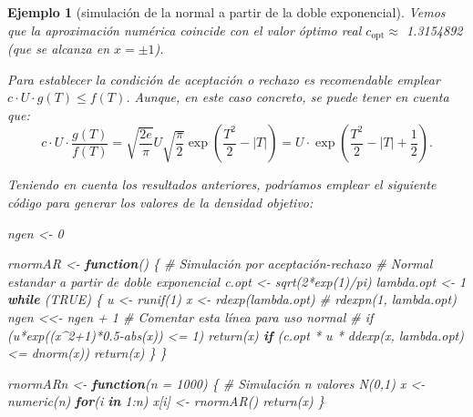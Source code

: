 \documentclass[
]{book}
\newenvironment{Shaded}{\begin{snugshade}}{\end{snugshade}}
\newcommand{\AttributeTok}[1]{\textcolor[rgb]{0.77,0.63,0.00}{#1}}
\newcommand{\CommentTok}[1]{\textcolor[rgb]{0.56,0.35,0.01}{\textit{#1}}}
\newcommand{\ConstantTok}[1]{\textcolor[rgb]{0.00,0.00,0.00}{#1}}
\newcommand{\ControlFlowTok}[1]{\textcolor[rgb]{0.13,0.29,0.53}{\textbf{#1}}}
\newcommand{\DecValTok}[1]{\textcolor[rgb]{0.00,0.00,0.81}{#1}}
\newcommand{\FunctionTok}[1]{\textcolor[rgb]{0.00,0.00,0.00}{#1}}
\newcommand{\NormalTok}[1]{#1}
\newcommand{\OtherTok}[1]{\textcolor[rgb]{0.56,0.35,0.01}{#1}}
\newcommand{\SpecialCharTok}[1]{\textcolor[rgb]{0.00,0.00,0.00}{#1}}
\theoremstyle{break}
\newtheorem{example}{Ejemplo}[chapter]
\theoremstyle{nonumberplain}
\begin{document}
\begin{example}[simulación de la normal a partir de la doble exponencial]
Vemos que la aproximación numérica coincide con el valor óptimo real \(c_{\text{opt}} \approx\) 1.3154892 (que se alcanza en \(x = \pm 1\)).

Para establecer la condición de aceptación o rechazo es recomendable emplear
\(c\cdot U\cdot g\left( T\right) \leq f\left( T\right)\).
Aunque, en este caso concreto, se puede tener en cuenta que:
\[c\cdot U\cdot\frac{g\left( T\right)  }{f\left( T\right)  }=\sqrt{\frac
{2e}{\pi}}U\sqrt{\frac{\pi}{2}}\exp\left( \frac{T^{2}}{2}-\left\vert
T\right\vert \right)  =U\cdot\exp\left( \frac{T^{2}}{2}-\left\vert
T\right\vert +\frac{1}{2}\right).\]

Teniendo en cuenta los resultados anteriores, podríamos emplear el siguiente código para generar los valores de la densidad objetivo:

\begin{Shaded}
\begin{Highlighting}[]
\NormalTok{ngen }\OtherTok{\textless{}{-}} \DecValTok{0}

\NormalTok{rnormAR }\OtherTok{\textless{}{-}} \ControlFlowTok{function}\NormalTok{() \{}
\CommentTok{\# Simulación por aceptación{-}rechazo}
\CommentTok{\# Normal estandar a partir de doble exponencial}
\NormalTok{  c.opt }\OtherTok{\textless{}{-}} \FunctionTok{sqrt}\NormalTok{(}\DecValTok{2}\SpecialCharTok{*}\FunctionTok{exp}\NormalTok{(}\DecValTok{1}\NormalTok{)}\SpecialCharTok{/}\NormalTok{pi)}
\NormalTok{  lambda.opt }\OtherTok{\textless{}{-}} \DecValTok{1}
  \ControlFlowTok{while}\NormalTok{ (}\ConstantTok{TRUE}\NormalTok{) \{}
\NormalTok{    u }\OtherTok{\textless{}{-}} \FunctionTok{runif}\NormalTok{(}\DecValTok{1}\NormalTok{)}
\NormalTok{    x }\OtherTok{\textless{}{-}} \FunctionTok{rdexp}\NormalTok{(lambda.opt) }\CommentTok{\# rdexpn(1, lambda.opt)}
\NormalTok{    ngen }\OtherTok{\textless{}\textless{}{-}}\NormalTok{ ngen }\SpecialCharTok{+} \DecValTok{1} \CommentTok{\# Comentar esta línea para uso normal}
    \CommentTok{\# if (u*exp((x\^{}2+1)*0.5{-}abs(x)) \textless{}= 1) return(x)}
    \ControlFlowTok{if}\NormalTok{ (c.opt }\SpecialCharTok{*}\NormalTok{ u }\SpecialCharTok{*} \FunctionTok{ddexp}\NormalTok{(x, lambda.opt) }\SpecialCharTok{\textless{}=} \FunctionTok{dnorm}\NormalTok{(x)) }\FunctionTok{return}\NormalTok{(x)}
\NormalTok{  \}}
\NormalTok{\}}

\NormalTok{rnormARn }\OtherTok{\textless{}{-}} \ControlFlowTok{function}\NormalTok{(}\AttributeTok{n =} \DecValTok{1000}\NormalTok{) \{}
\CommentTok{\# Simulación n valores N(0,1)}
\NormalTok{    x }\OtherTok{\textless{}{-}} \FunctionTok{numeric}\NormalTok{(n)}
    \ControlFlowTok{for}\NormalTok{(i }\ControlFlowTok{in} \DecValTok{1}\SpecialCharTok{:}\NormalTok{n) x[i] }\OtherTok{\textless{}{-}} \FunctionTok{rnormAR}\NormalTok{()}
    \FunctionTok{return}\NormalTok{(x)}
\NormalTok{\}}
\end{Highlighting}
\end{Shaded}


\end{example}
\end{document}
